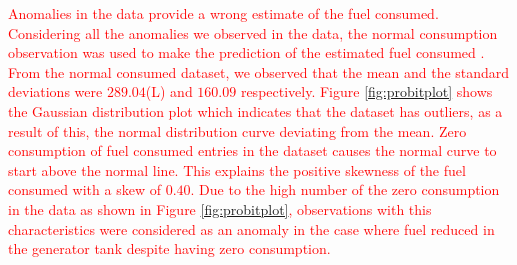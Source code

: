 \documentclass[a4paper,fleqn]{cas-dc}
\newcommand\mycorrections[1]{\textcolor{red}{#1}}
\begin{document}

\mycorrections{ Anomalies in the data provide a wrong estimate of the fuel consumed. Considering all the anomalies we observed in the data, the normal consumption observation was used to make the prediction of the estimated fuel consumed \cite{maxime2018}. From the normal consumed dataset, we observed that the mean and the standard deviations were $289.04$(L) and $160.09$ respectively.
	Figure \ref{fig:probitplot} shows the Gaussian distribution plot which indicates that the dataset has outliers, as a result of this, the normal distribution curve deviating from the mean. Zero consumption of fuel consumed entries in the dataset causes the normal curve to start above the normal line. This explains the positive skewness of the fuel consumed with a skew of  $0.40$. Due to the high number of the zero consumption in the data as shown in Figure \ref{fig:probitplot}, observations with this characteristics were considered as an anomaly in the case where fuel reduced in the generator tank despite having zero consumption. 
}
\end{document}
